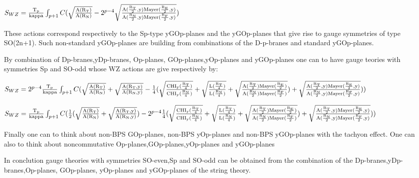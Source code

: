 \documentclass[a4paper,a4paper]{article}
\begin{document}
\begin{center}
{  $ S_{WZ} = \frac{\rm T_p}{\rm kappa}\int_{p+1} C(\sqrt{\frac{\rm A(R_T)}{\rm A(R_N)}}-2^{p-4}\sqrt{\frac{\rm A(\frac{\rm R_T}{\rm 2},y)Mayer(\frac{\rm R_E}{\rm 2},y)}{\rm A(\frac{\rm R_N}{\rm 2},y)Mayer(\frac{\rm R_F}{\rm 2},y)}})$ }
\end{center}
These actions correspond respectively to the Sp-type yGOp-planes and the yGOp-planes that give rise to gauge symmetries of type SO(2n+1).  Such non-standard yGOp-planes are building from combinations of the D-p-branes and standard yGOp-planes.

By combination of Dp-branes,yDp-branes, Op-planes, GOp-planes,yOp-planes and yGOp-planes one can to have gauge teories with symmetries Sp and SO-odd whose WZ actions are give respectively by:
\begin{center}
{  $ S_{WZ} = 2^{p-4}\frac{\rm T_p}{\rm kappa}\int_{p+1} C(\sqrt{\frac{\rm A(R_T)}{\rm A(R_N)}}+\sqrt{\frac{\rm A(R_T,y)}{\rm A(R_N,y)}}-\frac{\rm 1}{\rm 4}(\sqrt{\frac{\rm CHI_y(\frac{\rm R_T}{\rm 4}) }{\rm CHI_y(\frac{\rm R_N}{\rm 4})}}+\sqrt{\frac{\rm L(\frac{\rm R_T}{\rm 4}) }{\rm L(\frac{\rm R_N}{\rm 4})}}+\sqrt{\frac{\rm A(\frac{\rm R_T}{\rm 2})Mayer(\frac{\rm R_E}{\rm 2})}{\rm A(\frac{\rm R_N}{\rm 2})Mayer(\frac{\rm R_F}{\rm 2})}})+\sqrt{\frac{\rm A(\frac{\rm R_T}{\rm 2},y)Mayer(\frac{\rm R_E}{\rm 2},y)}{\rm A(\frac{\rm R_N}{\rm 2},y)Mayer(\frac{\rm R_F}{\rm 2},y)}}))$ }
\end{center}
\begin{center}
{  $ S_{WZ} = \frac{\rm T_p}{\rm kappa}\int_{p+1} C(\frac{\rm 1}{\rm 2}(\sqrt{\frac{\rm A(R_T)}{\rm A(R_N)}}+\sqrt{\frac{\rm A(R_T,y)}{\rm A(R_N,y)}})-2^{p-4}\frac{\rm 1}{\rm 4}(\sqrt{\frac{\rm CHI_y(\frac{\rm R_T}{\rm 4} )}{\rm CHI_y(\frac{\rm R_N}{\rm 4})}}+\sqrt{\frac{\rm L(\frac{\rm R_T}{\rm 4}) }{\rm L(\frac{\rm R_N}{\rm 4})}}+\sqrt{\frac{\rm A(\frac{\rm R_T}{\rm 2})Mayer(\frac{\rm R_E}{\rm 2})}{\rm A(\frac{\rm R_N}{\rm 2})Mayer(\frac{\rm R_F}{\rm 2})}})+\sqrt{\frac{\rm A(\frac{\rm R_T}{\rm 2},y)Mayer(\frac{\rm R_E}{\rm 2},y)}{\rm A(\frac{\rm R_N}{\rm 2},y)Mayer(\frac{\rm R_F}{\rm 2},y)}}))$ }
\end{center}

Finally one can to think about non-BPS GOp-planes, non-BPS yOp-planes and non-BPS yGOp-planes with the tachyon effect. One can also to think about noncommutative Op-planes,GOp-planes,yOp-planes and yGOp-planes

In conclution gauge theories with symmetries SO-even,Sp and SO-odd can be obtained from the combination of the Dp-branes,yDp-branes,Op-planes, GOp-planes, yOp-planes and yGOp-planes of the string theory.
\end{document}
